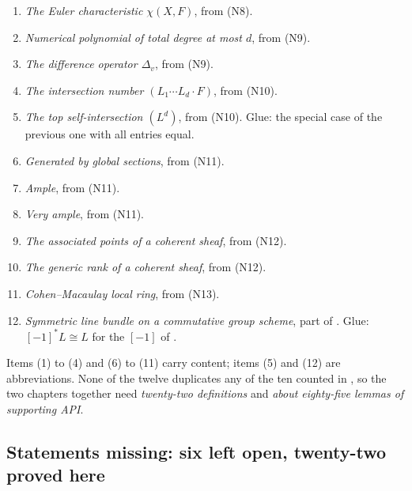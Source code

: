 \begin{enumerate}
  \item \emph{The Euler characteristic $\chi(X,F)$}, from (N8).
  \item \emph{Numerical polynomial of total degree at most $d$}, from (N9).
  \item \emph{The difference operator $\Delta_v$}, from (N9).
  \item \emph{The intersection number $(L_1\cdots L_d\cdot F)$}, from (N10).
  \item \emph{The top self-intersection $(L^d)$}, from (N10).  Glue: the
  special case of the previous one with all entries equal.
  \item \emph{Generated by global sections}, from (N11).
  \item \emph{Ample}, from (N11).
  \item \emph{Very ample}, from (N11).
  \item \emph{The associated points of a coherent sheaf}, from (N12).
  \item \emph{The generic rank of a coherent sheaf}, from (N12).
  \item \emph{Cohen--Macaulay local ring}, from (N13).
  \item \emph{Symmetric line bundle on a commutative group scheme}, part of
  .  Glue: $[-1]^*L\cong L$ for the $[-1]$ of
  .
\end{enumerate}
Items (1) to (4) and (6) to (11) carry content; items (5) and (12) are
abbreviations.  None of the twelve duplicates any of the ten counted in
, so the two chapters together need
\emph{twenty-two definitions} and \emph{about eighty-five lemmas of supporting
API}.

\subsection*{Statements missing: six left open, twenty-two proved here}

